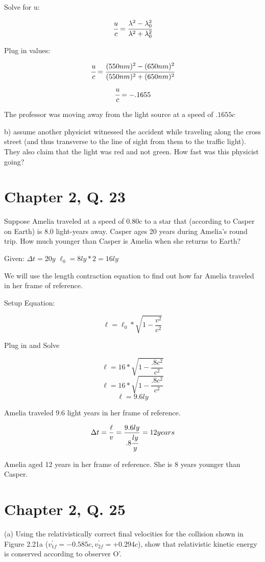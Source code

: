 \documentclass{article}
\begin{document}
Solve for u:

$$ \cfrac{u}{c} = \cfrac{\lambda^{2} - \lambda_0^{2}}{\lambda^{2}+\lambda_0^2} $$

Plug in values:

$$ \cfrac{u}{c} = \cfrac{(550nm)^2 - (650nm)^2}{(550nm)^2 + (650nm)^2} $$
$$ \cfrac{u}{c} = -.1655 $$

The professor was moving away from the light source at a speed of $ .1655c $

b) assume another physicist witnessed the accident while traveling along the cross street (and thus transverse to the line of sight from them to the traffic light). They also claim that the light was red and not green. How fast was this physicist going?


\section*{Chapter 2, Q. 23}
Suppose Amelia traveled at a speed of 0.80c to a star that (according to Casper on Earth) is 8.0 light-years away.  Casper ages 20 years during Amelia's round trip. How much younger than Casper is Amelia when she returns to Earth?

Given: $ \Delta t = 20y $ $ \ell_0 = 8ly * 2 = 16ly $

We will use the length contraction equation to find out how far Amelia traveled in her frame of reference.

Setup Equation:

$$ \ell = \ell_0 * \sqrt{1 - \frac{v^2}{c^2}} $$

Plug in and Solve

$$ \ell = 16 * \sqrt{1 - \frac{.8c^2}{c^2}} $$
$$ \ell = 16 * \sqrt{1 - \frac{.8c^2}{c^2}} $$
$$ \ell = 9.6 ly $$

Amelia traveled 9.6 light years in her frame of reference.

$$\Delta t = \frac{\ell}{v} = \frac{9.6ly}{.8 \cfrac{ly}{y}} = 12 years $$

Amelia aged 12 years in her frame of reference. She is 8 years younger than Casper.

\section*{Chapter 2, Q. 25}
(a) Using the relativistically correct final velocities for the collision shown in Figure 2.21a ($v^{'}_{1f} = -0.585c, v^{'}_{2f}=+0.294c$), show that relativistic kinetic energy is conserved according to observer O'.
\end{document}
